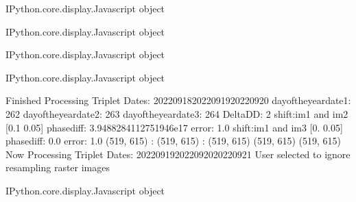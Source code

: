\documentclass[letterpaper,10pt]{sphinxmanual}
\begin{document}
\begin{sphinxVerbatim}[commandchars=\\\{\}]
\PYGZlt{}IPython.core.display.Javascript object\PYGZgt{}
\end{sphinxVerbatim}



\begin{sphinxVerbatim}[commandchars=\\\{\}]
\PYGZlt{}IPython.core.display.Javascript object\PYGZgt{}
\end{sphinxVerbatim}



\begin{sphinxVerbatim}[commandchars=\\\{\}]
\PYGZlt{}IPython.core.display.Javascript object\PYGZgt{}
\end{sphinxVerbatim}



\begin{sphinxVerbatim}[commandchars=\\\{\}]
\PYGZlt{}IPython.core.display.Javascript object\PYGZgt{}
\end{sphinxVerbatim}



\begin{sphinxVerbatim}[commandchars=\\\{\}]
Finished Processing Triplet Dates:  20220918\PYGZhy{}20220919\PYGZhy{}20220920
day\PYGZus{}of\PYGZus{}the\PYGZus{}year\PYGZus{}date1:  262
\PYGZhy{}\PYGZhy{}\PYGZhy{}\PYGZhy{}\PYGZhy{}\PYGZhy{}\PYGZhy{}\PYGZhy{}\PYGZhy{}\PYGZhy{}\PYGZhy{}\PYGZhy{}\PYGZhy{}\PYGZhy{}\PYGZhy{}\PYGZhy{}\PYGZhy{}\PYGZhy{}\PYGZhy{}\PYGZhy{}\PYGZhy{}
day\PYGZus{}of\PYGZus{}the\PYGZus{}year\PYGZus{}date2:  263
\PYGZhy{}\PYGZhy{}\PYGZhy{}\PYGZhy{}\PYGZhy{}\PYGZhy{}\PYGZhy{}\PYGZhy{}\PYGZhy{}\PYGZhy{}\PYGZhy{}\PYGZhy{}\PYGZhy{}\PYGZhy{}\PYGZhy{}\PYGZhy{}\PYGZhy{}\PYGZhy{}\PYGZhy{}\PYGZhy{}\PYGZhy{}
day\PYGZus{}of\PYGZus{}the\PYGZus{}year\PYGZus{}date3:  264
\PYGZhy{}\PYGZhy{}\PYGZhy{}\PYGZhy{}\PYGZhy{}\PYGZhy{}\PYGZhy{}\PYGZhy{}\PYGZhy{}\PYGZhy{}\PYGZhy{}\PYGZhy{}\PYGZhy{}\PYGZhy{}\PYGZhy{}\PYGZhy{}\PYGZhy{}\PYGZhy{}\PYGZhy{}\PYGZhy{}\PYGZhy{}
Delta\PYGZus{}DD: 2
shift:im1 and im2 [\PYGZhy{}0.1   0.05] phasediff: 3.9488284112751946e\PYGZhy{}17 error: 1.0
shift:im1 and im3 [0.   0.05] phasediff: \PYGZhy{}0.0 error: 1.0
(519, 615) :  (519, 615) :  (519, 615)
(519, 615)
(519, 615)
Now Processing Triplet Dates:  20220919\PYGZhy{}20220920\PYGZhy{}20220921
 User selected to ignore resampling raster images 



\PYGZlt{}IPython.core.display.Javascript object\PYGZgt{}
\end{sphinxVerbatim}
\end{document}
